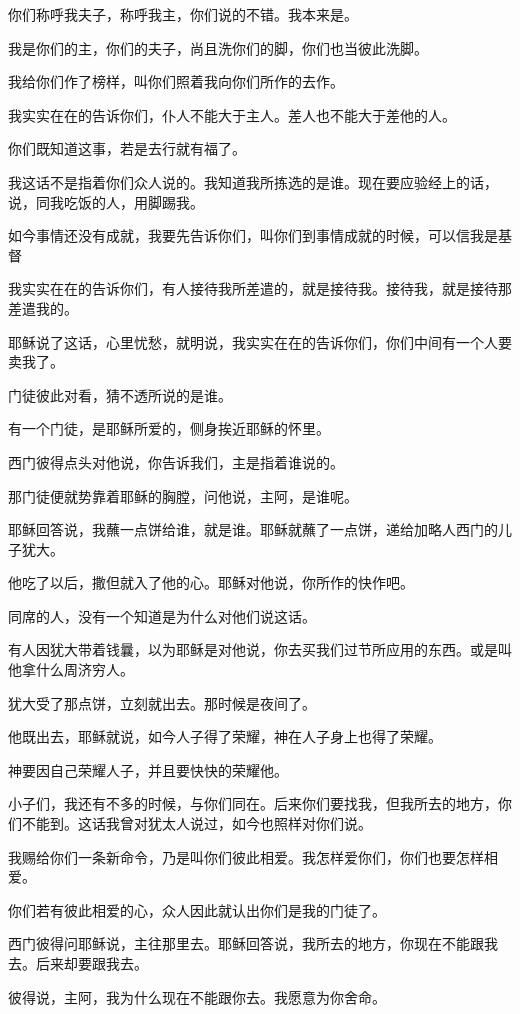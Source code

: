 \documentclass[12pt,oneside]{book}
\begin{document}
你们称呼我夫子，称呼我主，你们说的不错。我本来是。

我是你们的主，你们的夫子，尚且洗你们的脚，你们也当彼此洗脚。

我给你们作了榜样，叫你们照着我向你们所作的去作。

我实实在在的告诉你们，仆人不能大于主人。差人也不能大于差他的人。

你们既知道这事，若是去行就有福了。

我这话不是指着你们众人说的。我知道我所拣选的是谁。现在要应验经上的话，说，同我吃饭的人，用脚踢我。

如今事情还没有成就，我要先告诉你们，叫你们到事情成就的时候，可以信我是基督

我实实在在的告诉你们，有人接待我所差遣的，就是接待我。接待我，就是接待那差遣我的。

耶稣说了这话，心里忧愁，就明说，我实实在在的告诉你们，你们中间有一个人要卖我了。

门徒彼此对看，猜不透所说的是谁。

有一个门徒，是耶稣所爱的，侧身挨近耶稣的怀里。

西门彼得点头对他说，你告诉我们，主是指着谁说的。

那门徒便就势靠着耶稣的胸膛，问他说，主阿，是谁呢。

耶稣回答说，我蘸一点饼给谁，就是谁。耶稣就蘸了一点饼，递给加略人西门的儿子犹大。

他吃了以后，撒但就入了他的心。耶稣对他说，你所作的快作吧。

同席的人，没有一个知道是为什么对他们说这话。

有人因犹大带着钱曩，以为耶稣是对他说，你去买我们过节所应用的东西。或是叫他拿什么周济穷人。

犹大受了那点饼，立刻就出去。那时候是夜间了。

他既出去，耶稣就说，如今人子得了荣耀，神在人子身上也得了荣耀。

神要因自己荣耀人子，并且要快快的荣耀他。

小子们，我还有不多的时候，与你们同在。后来你们要找我，但我所去的地方，你们不能到。这话我曾对犹太人说过，如今也照样对你们说。

我赐给你们一条新命令，乃是叫你们彼此相爱。我怎样爱你们，你们也要怎样相爱。

你们若有彼此相爱的心，众人因此就认出你们是我的门徒了。

西门彼得问耶稣说，主往那里去。耶稣回答说，我所去的地方，你现在不能跟我去。后来却要跟我去。

彼得说，主阿，我为什么现在不能跟你去。我愿意为你舍命。
\end{document}
